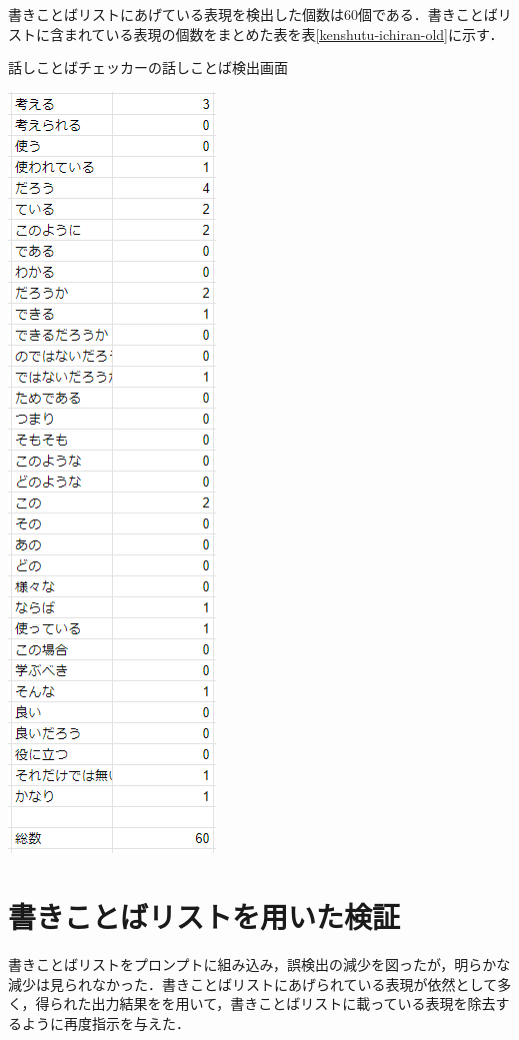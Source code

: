 書きことばリストにあげている表現を検出した個数は60個である．書きことばリストに含まれている表現の個数をまとめた表を表\ref{kenshutu-ichiran-old}に示す．

\begin{table}[H]
	\centering
        \caption{話しことばチェッカーの話しことば検出画面}
 	\includegraphics[width=55mm]{image/kenshutu-ichiran-old.png}
	\label{kenshutu-ichiran-old}
\end{table}

\section{書きことばリストを用いた検証 \label{c7s2}}
書きことばリストをプロンプトに組み込み，誤検出の減少を図ったが，明らかな減少は見られなかった．書きことばリストにあげられている表現が依然として多く，得られた出力結果をを用いて，書きことばリストに載っている表現を除去するように再度指示を与えた．

